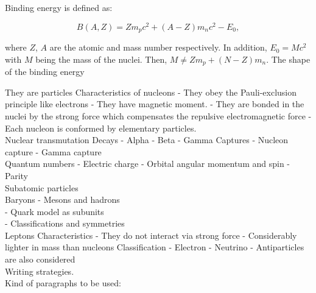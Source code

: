 \documentclass[openany]{book}
\begin{document}
Binding energy is defined as:

\begin{equation} \label{eq:restEnergy}
	 B(A, Z) = Zm_pc^2 + (A-Z)m_nc^2 - E_0,
\end{equation}

where $Z$, $A$ are the atomic and mass number respectively.  In addition, $E_0 = Mc^2$ with $M$ being the mass of the nuclei. Then, $M \neq Zm_p + (N - Z)m_n$. The shape of the binding energy \\


They are particles
Characteristics of nucleons
-	They obey the Pauli-exclusion principle like electrons
- 	They have magnetic moment.
-	They are bonded in the nuclei by the strong force which compensates the repulsive electromagnetic force
-	Each nucleon is conformed by elementary particles. \\

Nuclear transmutation 
Decays
-	Alpha 
-	Beta
-	Gamma 
Captures 
-	Nucleon capture
-	Gamma capture \\ 

Quantum numbers
-	Electric charge
-	Orbital angular momentum and spin 
-	Parity \\ 

Subatomic particles  \\

Baryons 
-	Mesons and hadrons  \\
-	Quark model as subunits  \\
- 	Classifications and symmetries \\

Leptons 
Characteristics
-	They do not interact via strong force
-	Considerably lighter in mass than nucleons
Classification 
-	Electron 
-	Neutrino 
-	Antiparticles are also considered \\ 

Writing strategies. \\

Kind of paragraphs to be used:  \\
\end{document}
